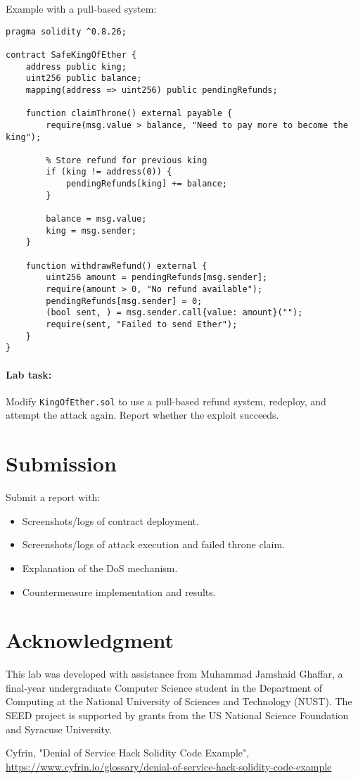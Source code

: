 Example with a pull-based system:
\begin{lstlisting}[language=Solidity]
% SPDX-License-Identifier: MIT
pragma solidity ^0.8.26;

contract SafeKingOfEther {
    address public king;
    uint256 public balance;
    mapping(address => uint256) public pendingRefunds;

    function claimThrone() external payable {
        require(msg.value > balance, "Need to pay more to become the king");
        
        % Store refund for previous king
        if (king != address(0)) {
            pendingRefunds[king] += balance;
        }
        
        balance = msg.value;
        king = msg.sender;
    }

    function withdrawRefund() external {
        uint256 amount = pendingRefunds[msg.sender];
        require(amount > 0, "No refund available");
        pendingRefunds[msg.sender] = 0;
        (bool sent, ) = msg.sender.call{value: amount}("");
        require(sent, "Failed to send Ether");
    }
}
\end{lstlisting}

\paragraph{Lab task:} Modify \texttt{KingOfEther.sol} to use a pull-based refund system, redeploy, and attempt the attack again. Report whether the exploit succeeds.

\section{Submission}

Submit a report with:
\begin{itemize}
    \item Screenshots/logs of contract deployment.
    \item Screenshots/logs of attack execution and failed throne claim.
    \item Explanation of the DoS mechanism.
    \item Countermeasure implementation and results.
\end{itemize}

\section*{Acknowledgment}

This lab was developed with assistance from Muhammad Jamshaid Ghaffar, a final-year undergraduate Computer Science student in the Department of Computing at the National University of Sciences and Technology (NUST). The SEED project is supported by grants from the US National Science Foundation and Syracuse University.

\begin{thebibliography}{90}
Cyfrin, "Denial of Service Hack Solidity Code Example",
\url{https://www.cyfrin.io/glossary/denial-of-service-hack-solidity-code-example}
\end{thebibliography}

